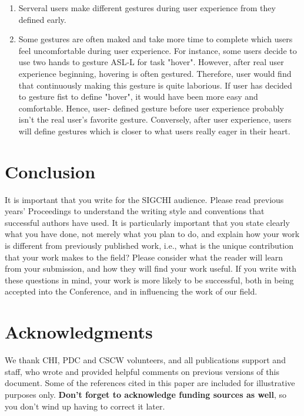 \documentclass{sigchi}
\begin{document}
\begin{enumerate}
\item Serveral users make different gestures during user experience from they defined early.  
\item Some gestures are often maked and take more time to complete which users feel uncomfortable during user experience.  For instance, some users decide to use two hands to gesture ASL-L for task "hover". However, after real user experience beginning, hovering is often gestured. Therefore, user would find that continuously making this gesture is quite laborious. If user has decided to gesture fist to define "hover", it would have been more easy and comfortable. Hence, user- defined gesture before user experience probably  isn't the real user's  favorite gesture. Conversely, after user experience, users will define gestures which is closer to what users really eager in their heart.

\end{enumerate}


\section{Conclusion}

It is important that you write for the SIGCHI audience.  Please read
previous years' Proceedings to understand the writing style and
conventions that successful authors have used.  It is particularly
important that you state clearly what you have done, not merely what
you plan to do, and explain how your work is different from previously
published work, i.e., what is the unique contribution that your work
makes to the field?  Please consider what the reader will learn from
your submission, and how they will find your work useful.  If you
write with these questions in mind, your work is more likely to be
successful, both in being accepted into the Conference, and in
influencing the work of our field.

\section{Acknowledgments}

We thank CHI, PDC and CSCW volunteers, and all publications support
and staff, who wrote and provided helpful comments on previous
versions of this document.  Some of the references cited in this paper
are included for illustrative purposes only.  \textbf{Don't forget
to acknowledge funding sources as well}, so you don't wind up
having to correct it later.
\end{document}
